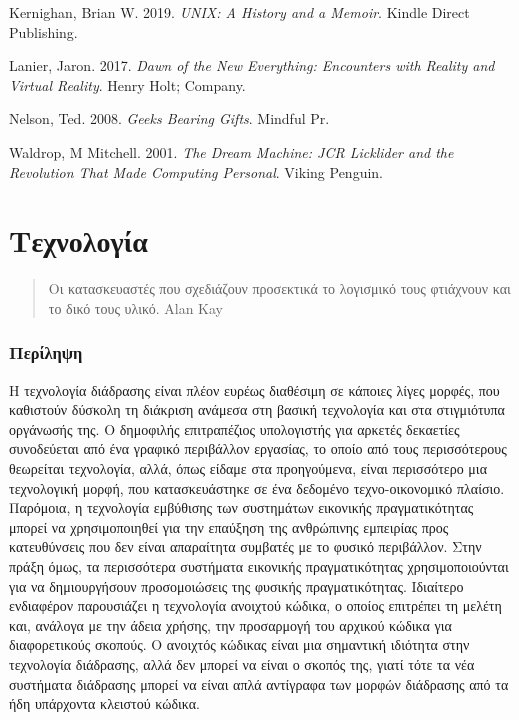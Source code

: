 \documentclass[
]{article}
\begin{document}
Kernighan, Brian W. 2019. \emph{UNIX: A History and a Memoir}. Kindle
Direct Publishing.

Lanier, Jaron. 2017. \emph{Dawn of the New Everything: Encounters with
Reality and Virtual Reality}. Henry Holt; Company.

Nelson, Ted. 2008. \emph{Geeks Bearing Gifts}. Mindful Pr.

Waldrop, M Mitchell. 2001. \emph{The Dream Machine: JCR Licklider and
the Revolution That Made Computing Personal}. Viking Penguin.

\hypertarget{ux3c4ux3b5ux3c7ux3bdux3bfux3bbux3bfux3b3ux3afux3b1}{%
\section{Τεχνολογία}\label{ux3c4ux3b5ux3c7ux3bdux3bfux3bbux3bfux3b3ux3afux3b1}}

\begin{quote}
Οι κατασκευαστές που σχεδιάζουν προσεκτικά το λογισμικό τους φτιάχνουν
και το δικό τους υλικό. Alan Kay
\end{quote}

\hypertarget{ux3c0ux3b5ux3c1ux3afux3bbux3b7ux3c8ux3b7}{%
\subsubsection{Περίληψη}\label{ux3c0ux3b5ux3c1ux3afux3bbux3b7ux3c8ux3b7}}

Η τεχνολογία διάδρασης είναι πλέον ευρέως διαθέσιμη σε κάποιες λίγες
μορφές, που καθιστούν δύσκολη τη διάκριση ανάμεσα στη βασική τεχνολογία
και στα στιγμιότυπα οργάνωσής της. Ο δημοφιλής επιτραπέζιος υπολογιστής
για αρκετές δεκαετίες συνοδεύεται από ένα γραφικό περιβάλλον εργασίας,
το οποίο από τους περισσότερους θεωρείται τεχνολογία, αλλά, όπως είδαμε
στα προηγούμενα, είναι περισσότερο μια τεχνολογική μορφή, που
κατασκευάστηκε σε ένα δεδομένο τεχνο-οικονομικό πλαίσιο. Παρόμοια, η
τεχνολογία εμβύθισης των συστημάτων εικονικής πραγματικότητας μπορεί να
χρησιμοποιηθεί για την επαύξηση της ανθρώπινης εμπειρίας προς
κατευθύνσεις που δεν είναι απαραίτητα συμβατές με το φυσικό περιβάλλον.
Στην πράξη όμως, τα περισσότερα συστήματα εικονικής πραγματικότητας
χρησιμοποιούνται για να δημιουργήσουν προσομοιώσεις της φυσικής
πραγματικότητας. Ιδιαίτερο ενδιαφέρον παρουσιάζει η τεχνολογία ανοιχτού
κώδικα, ο οποίος επιτρέπει τη μελέτη και, ανάλογα με την άδεια χρήσης,
την προσαρμογή του αρχικού κώδικα για διαφορετικούς σκοπούς. Ο ανοιχτός
κώδικας είναι μια σημαντική ιδιότητα στην τεχνολογία διάδρασης, αλλά δεν
μπορεί να είναι ο σκοπός της, γιατί τότε τα νέα συστήματα διάδρασης
μπορεί να είναι απλά αντίγραφα των μορφών διάδρασης από τα ήδη υπάρχοντα
κλειστού κώδικα.
\end{document}
